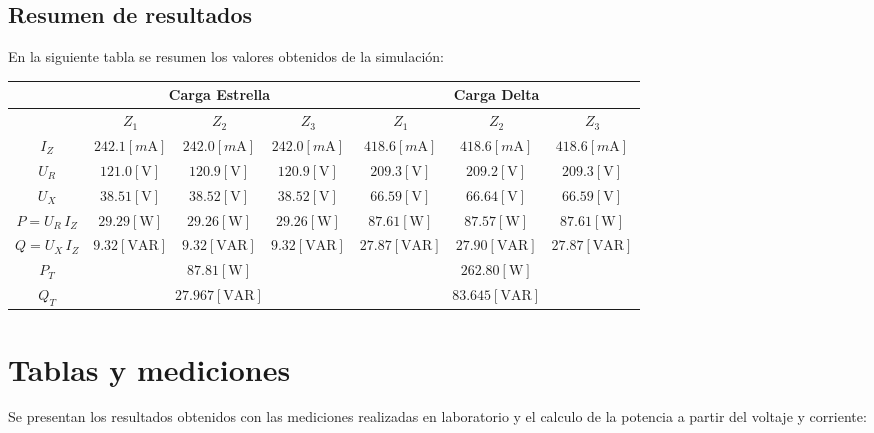 \documentclass[letter,11pt]{article}
\begin{document}
\subsection{Resumen de resultados}
En la siguiente tabla se resumen los valores obtenidos de la simulación: 

\begin{center}
    \begin{tabular}{|c||c|c|c||c|c|c|}
    \hline
    & \multicolumn{3}{|c||}{\textbf{Carga Estrella}} &
    \multicolumn{3}{|c|}{\textbf{Carga Delta}}
    \tabularnewline \hline \hline
    & $Z_1$ & $Z_2$ & $Z_3$ & $Z_1$ & $Z_2$ & $Z_3$
    \tabularnewline \hline \hline
    $I_Z$ &
    $242.1[m\text{A}]$ & $242.0[m\text{A}]$ & $242.0[m\text{A}]$ &
    $418.6[m\text{A}]$ & $418.6[m\text{A}]$ & $418.6[m\text{A}]$
    \tabularnewline \hline
    $U_R$ &
    $121.0[\text{V}]$ & $120.9[\text{V}]$ & $120.9[\text{V}]$ &
    $209.3[\text{V}]$ & $209.2[\text{V}]$ & $209.3[\text{V}]$
    \tabularnewline \hline
    $U_X$ &
    $38.51[\text{V}]$ & $38.52[\text{V}]$ & $38.52[\text{V}]$ &
    $66.59[\text{V}]$ & $66.64[\text{V}]$ & $66.59[\text{V}]$
    \tabularnewline \hline \hline
    $P=U_R\,I_Z$ &
    $29.29[\text{W}]$ & $29.26[\text{W}]$ & $29.26[\text{W}]$ &
    $87.61[\text{W}]$ & $87.57[\text{W}]$ & $87.61[\text{W}]$
    \tabularnewline \hline
    $Q=U_X\,I_Z$ &
    $9.32[\text{VAR}]$ & $9.32[\text{VAR}]$ & $9.32[\text{VAR}]$ &
    $27.87[\text{VAR}]$ & $27.90[\text{VAR}]$ & $27.87[\text{VAR}]$
    \tabularnewline \hline \hline
    $P_T$ &
    \multicolumn{3}{|c||}{$87.81[\text{W}]$} &
    \multicolumn{3}{|c|}{$262.80[\text{W}]$}
    \tabularnewline \hline
    $Q_T$ &
    \multicolumn{3}{|c||}{$27.967[\text{VAR}]$} &
    \multicolumn{3}{|c|}{$83.645[\text{VAR}]$}
    \tabularnewline \hline
    \end{tabular}
\end{center}

\section{Tablas y mediciones}
Se presentan los resultados obtenidos con las mediciones realizadas en 
laboratorio y el calculo de la potencia a partir del voltaje y corriente:
\end{document}
